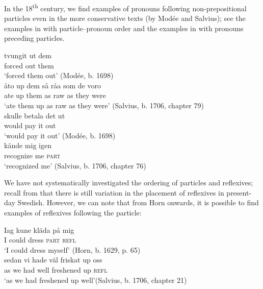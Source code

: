 \documentclass[output=paper]{langscibook}
\begin{document}
In the 18\textsuperscript{th} century, we find examples of pronouns following non-prepositional particles even in the more conservative texts (by Modée and Salvius); see the examples in  with particle–pronoun order and the examples in  with pronouns preceding particles.


\ea\label{ex:lalu:34}
\ea\label{ex:lalu:34a}
\gll  tvungit   ut   dem\\
   forced   out   them\\
\glt `forced them out’ (Modée, b. 1698)\\

\ex\label{ex:lalu:34b}
\gll  åto  up  dem     så   råa   som  de   voro\\
    ate    up  them    as   raw   as     they   were\\
\glt `ate them up as raw as they were’ (Salvius, b. 1706, chapter 79)\\
\z
\ex\label{ex:lalu:35}
\ea\label{ex:lalu:35a}
\gll  skulle   betala   det   ut\\
    would   pay     it     out\\
\glt `would pay it out’ (Modée, b. 1698)\\

\ex\label{ex:lalu:35b}
\gll  kände     mig   igen \\
   recognize   me   \textsc{part}\\
\glt `recognized me’ (Salvius, b. 1706, chapter 76)\\
\z
\z


We have not systematically investigated the ordering of particles and reflexives; recall from  that there is still variation in the placement of reflexives in present-day Swedish. However, we can note that from Horn onwards, it is possible to find examples of reflexives following the particle:


\ea\label{ex:lalu:36}
\ea\label{ex:lalu:36a}
\gll  Iag   kune   kläda   på     mig\\
    I        could   dress     \textsc{part}    \textsc{refl} \\
\glt `I could dress myself’ (Horn, b. 1629, p. 65)\\

\ex\label{ex:lalu:36b}
\gll  sedan   vi     hade    väl   friskat     up   oss\\
    as         we    had     well   freshened  up   \textsc{refl}\\
  \glt `as we had freshened up well’(Salvius, b. 1706, chapter 21)\\
\z
\z
\end{document}

